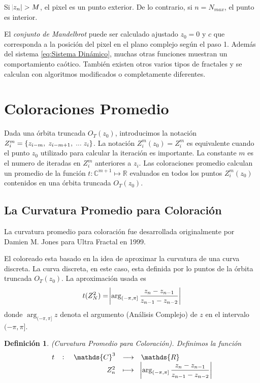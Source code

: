 \documentclass[12pt,letterpaper,final]{article}
\theoremstyle{plain}
\newtheorem{defn}{Definición}[section]
\theoremstyle{definition}
\theoremstyle{remark}
\numberwithin{equation}{section}
\begin{document}
Si $\abs{z_n} > M$, el pixel es un punto exterior. De lo contrario, si $n = N_{max}$, el punto es interior.

El \textit{conjunto de Mandelbrot} puede ser calculado ajustado $z_0 = 0$ y $c$ que corresponda a la posición del pixel en el plano complejo según el paso 1. Además del sistema \ref{eq:Sistema Dinámico}, muchas otras funciones muestran un comportamiento caótico. También existen otros varios tipos de fractales y se calculan con algoritmos modificados o completamente diferentes.

\section{Coloraciones Promedio}
Dada una órbita truncada $O_T(z_0)$, introducimos la notación $Z_i^m = \set{z_{i-m},\; z_{i-m+1},\;...\; z_i}$. La notación $Z_i^m(z_0) = Z_i^m$ es equivalente cuando el punto $z_0$ utilizado para calcular la iteración es importante. La constante $m$ es el numero de iteradas en $Z_i^m$ anteriores a $z_i$. Las coloraciones promedio calculan un promedio de la función $t:\mathds{C}^{m+1}\longmapsto\mathds{R}$ evaluados en todos los puntos $Z_{i}^{m}(z_0)$ contenidos en una órbita truncada $O_T(z_0)$.

\subsection{La Curvatura Promedio para Coloración}
La curvatura promedio para coloración fue desarrollada originalmente por Damien M. Jones para Ultra Fractal en 1999.

El coloreado esta basado en la idea de aproximar la curvatura de una curva discreta. La curva discreta, en este caso, esta definida por lo puntos de la órbita truncada $O_T(z_0)$. La aproximación usada es
\[ t(Z_{N}^{2}) = \abs{ \arg_{(-\pi, \pi]}  \frac{z_n - z_{n-1}}{z_{n-1} - z_{n-2}} } \]
donde $\arg_{(-\pi, \pi]}z$ denota el argumento (Análisis Complejo) de $z$ en el intervalo $(-\pi, \pi]$.

\begin{defn}
(Curvatura Promedio para Coloración). Definimos la función 
\begin{equation} \label{eq:Estimación de Curvatura}
\fullfunction{t}{\mathds{C}^3}{\mathds{R}}{Z_{n}^{2}}{ \abs{ \arg_{(-\pi, \pi]}  \dfrac{z_n - z_{n-1}}{z_{n-1} - z_{n-2}} }}
\end{equation} 
\end{defn}
\end{document}
